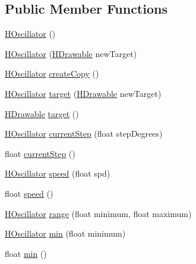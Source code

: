 \subsection*{Public Member Functions}
\begin{DoxyCompactItemize}
\item 
\hyperlink{classhype_1_1behavior_1_1_h_oscillator_ad9eeca3e0eb92c625da3dff51efc5d5f}{H\-Oscillator} ()
\item 
\hyperlink{classhype_1_1behavior_1_1_h_oscillator_aea107914923a35201665b88620f4f830}{H\-Oscillator} (\hyperlink{classhype_1_1drawable_1_1_h_drawable}{H\-Drawable} new\-Target)
\item 
\hyperlink{classhype_1_1behavior_1_1_h_oscillator}{H\-Oscillator} \hyperlink{classhype_1_1behavior_1_1_h_oscillator_ad5cd2ba994b3b2c1ca2086a76460fee4}{create\-Copy} ()
\item 
\hyperlink{classhype_1_1behavior_1_1_h_oscillator}{H\-Oscillator} \hyperlink{classhype_1_1behavior_1_1_h_oscillator_a4ac004ee4806ce0588fc1497edecbc85}{target} (\hyperlink{classhype_1_1drawable_1_1_h_drawable}{H\-Drawable} new\-Target)
\item 
\hyperlink{classhype_1_1drawable_1_1_h_drawable}{H\-Drawable} \hyperlink{classhype_1_1behavior_1_1_h_oscillator_a6f01827f6f900708b87c76927300ae45}{target} ()
\item 
\hyperlink{classhype_1_1behavior_1_1_h_oscillator}{H\-Oscillator} \hyperlink{classhype_1_1behavior_1_1_h_oscillator_ab1bf2c0d7e638addb0d9823c6359dc9d}{current\-Step} (float step\-Degrees)
\item 
float \hyperlink{classhype_1_1behavior_1_1_h_oscillator_ac3a5ad6531519c9e5b73edaf7bb95bbe}{current\-Step} ()
\item 
\hyperlink{classhype_1_1behavior_1_1_h_oscillator}{H\-Oscillator} \hyperlink{classhype_1_1behavior_1_1_h_oscillator_ae0c346112db1e7f29b6a1c882590490e}{speed} (float spd)
\item 
float \hyperlink{classhype_1_1behavior_1_1_h_oscillator_a2c054dffa5c2ededa357c58e6084298f}{speed} ()
\item 
\hyperlink{classhype_1_1behavior_1_1_h_oscillator}{H\-Oscillator} \hyperlink{classhype_1_1behavior_1_1_h_oscillator_a24acbc65bf85392efd52afe43f5d3d39}{range} (float minimum, float maximum)
\item 
\hyperlink{classhype_1_1behavior_1_1_h_oscillator}{H\-Oscillator} \hyperlink{classhype_1_1behavior_1_1_h_oscillator_a6e6c5524efeb48f55c5e79bca649393d}{min} (float minimum)
\item 
float \hyperlink{classhype_1_1behavior_1_1_h_oscillator_aca40e5b60ad4e5972fec351c94e2f9a3}{min} ()

\end{DoxyCompactItemize}
